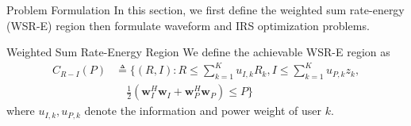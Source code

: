 \documentclass{IEEEtran}
\begin{document}
\begin{section}{Problem Formulation}
	In this section, we first define the weighted sum rate-energy (WSR-E) region then formulate waveform and IRS optimization problems.
	\begin{subsection}{Weighted Sum Rate-Energy Region}
		We define the achievable WSR-E region as
		\begin{equation}
			\begin{split}
				C_{R-I}(P)
				&\triangleq \biggl\{(R,I):R\le\sum_{k=1}^K{u_{I,k}R_k},I\le\sum_{k=1}^K u_{P,k}z_k,\\
				&\quad \frac{1}{2}({\boldsymbol{w}_I^H}{\boldsymbol{w}_I}+{\boldsymbol{w}_P^H}{\boldsymbol{w}_P}){\le}P\biggr\}
			\end{split}
		\end{equation}
		where $u_{I,k},u_{P,k}$ denote the information and power weight of user $k$.
	\end{subsection}


\end{section}
\end{document}
